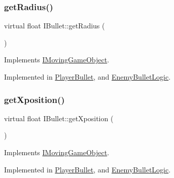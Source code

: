 \mbox{\label{class_i_bullet_a327968e71126cdea5998076d8919354f}} 
\subsubsection{\texorpdfstring{get\+Radius()}{getRadius()}}
{\footnotesize\ttfamily virtual float I\+Bullet\+::get\+Radius (\begin{DoxyParamCaption}{ }\end{DoxyParamCaption})\hspace{0.3cm}{\ttfamily [pure virtual]}}



Implements \hyperlink{class_i_moving_game_object_ab2120f126d088beda46654aa3ccfd705}{I\+Moving\+Game\+Object}.



Implemented in \hyperlink{class_player_bullet_a1ff56e38b1447500d2887b6fe1eeb674}{Player\+Bullet}, and \hyperlink{class_enemy_bullet_logic_a7e473b13bf07fdf8eb76b65e02879bf7}{Enemy\+Bullet\+Logic}.

\mbox{\label{class_i_bullet_a20babdd6c657ddda175e84a56564dcfa}} 
\subsubsection{\texorpdfstring{get\+Xposition()}{getXposition()}}
{\footnotesize\ttfamily virtual float I\+Bullet\+::get\+Xposition (\begin{DoxyParamCaption}{ }\end{DoxyParamCaption})\hspace{0.3cm}{\ttfamily [pure virtual]}}



Implements \hyperlink{class_i_moving_game_object_acc7f0195491b1843558c8c558cbc7363}{I\+Moving\+Game\+Object}.



Implemented in \hyperlink{class_player_bullet_aa9462c44892190316ee479a18693b6ad}{Player\+Bullet}, and \hyperlink{class_enemy_bullet_logic_afe73016d27c33171a20c15e11026106e}{Enemy\+Bullet\+Logic}.

\mbox{\label{class_i_bullet_a36594de9a0c0ddd7083bca10ef5d8332}} 
